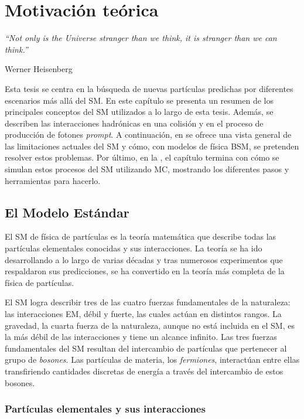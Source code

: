 \chapter{Motivación teórica}
\label{ch:theory}
\epigraph{\emph{\enquote{Not only is the Universe stranger than we think, it is stranger than we can think.}}}{Werner Heisenberg}


Esta tesis se centra en la búsqueda de nuevas partículas predichas por diferentes escenarios más allá del \ac{SM}. En este capítulo se presenta un resumen de los principales conceptos del \ac{SM} utilizados a lo largo de esta tesis. Además, se describen las interacciones hadrónicas en una colisión \pp y en el proceso de producción de fotones \textit{prompt}.
A continuación, en \Sect{\ref{sec:theory:bsm}} se ofrece una vista general de las limitaciones actuales del \ac{SM} y cómo, con modelos de física \ac{BSM}, se pretenden resolver estos problemas.
Por último, en la \Sect{\ref{sec:theory:mc_simulation}}, el capítulo termina con cómo se simulan estos procesos del \ac{SM} utilizando \ac{MC}, mostrando los diferentes pasos y herramientas para hacerlo.




\section{El Modelo Estándar}
\label{sec:theory:sm}

El \acf{SM} de física de partículas es la teoría matemática que describe todas las partículas elementales conocidas y sus interacciones.
La teoría se ha ido desarrollando a lo largo de varias décadas y tras numerosos experimentos que respaldaron sus predicciones, se ha convertido en la teoría más completa de la física de partículas.

El \ac{SM} logra describir tres de las cuatro fuerzas fundamentales de la naturaleza: las interacciones \ac{EM}, débil y fuerte, las cuales actúan en distintos rangos.
La gravedad, la cuarta fuerza de la naturaleza, aunque no está incluida en el \ac{SM}, es la más débil de las interacciones y tiene un alcance infinito.
Las tres fuerzas fundamentales del \ac{SM} resultan del intercambio de partículas que pertenecer al grupo de \textit{bosones}. Las partículas de materia, los \textit{fermiones}, interactúan entre ellas transfiriendo cantidades discretas de energía a través del intercambio de estos bosones.



\subsection{Partículas elementales y sus interacciones}
\label{subsec:theory:sm:particles_interaction}

